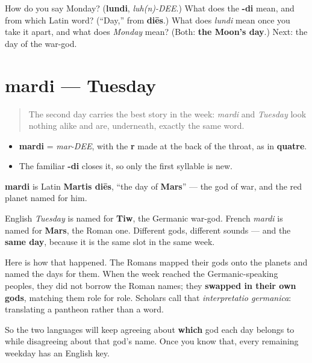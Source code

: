 \begin{tcolorbox}[breakable,colback=teal!4,colframe=teal!35!black,title={Before you move on}]
How do you say Monday? (\textbf{lundi}, \emph{luh(n)-DEE}.) What does the \textbf{-di} mean, and from which Latin word? (\textquotedblleft{}Day,\textquotedblright{} from \textbf{diēs}.) What does \emph{lundi} mean once you take it apart, and what does \emph{Monday} mean? (Both: \textbf{the Moon's day}.) Next: the day of the war-god.
\end{tcolorbox}
\section[mardi]{mardi — Tuesday}

\label{lesson:FR-C07-mardi}



\begin{quote}
The second day carries the best story in the week: \emph{mardi} and \emph{Tuesday} look nothing alike and are, underneath, exactly the same word.
\end{quote}

\begin{sounds}
\begin{itemize}
\raggedright
  \item \textbf{mardi} = \emph{mar-DEE}, with the \textbf{r} made at the back of the throat, as in \textbf{quatre}.
  \item The familiar \textbf{-di} closes it, so only the first syllable is new.
\end{itemize}
\end{sounds}

\begin{cousinweb}
\textbf{mardi} is Latin \textbf{Martis diēs}, \textquotedblleft{}the day of \textbf{Mars}\textquotedblright{} — the god of war, and the red planet named for him.
\end{cousinweb}

\begin{culture}
English \emph{Tuesday} is named for \textbf{Tiw}, the Germanic war-god. French \emph{mardi} is named for \textbf{Mars}, the Roman one. Different gods, different sounds — and the \textbf{same day}, because it is the same slot in the same week.

Here is how that happened. The Romans mapped their gods onto the planets and named the days for them. When the week reached the Germanic-speaking peoples, they did not borrow the Roman names; they \textbf{swapped in their own gods}, matching them role for role. Scholars call that \emph{interpretatio germanica}: translating a pantheon rather than a word.

So the two languages will keep agreeing about \textbf{which} god each day belongs to while disagreeing about that god's name. Once you know that, every remaining weekday has an English key.
\end{culture}

